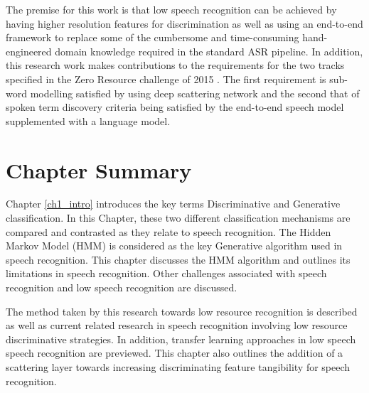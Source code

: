 The premise for this work is that low speech recognition can be achieved by having higher resolution features for discrimination as well as using an end-to-end framework to replace some of the cumbersome and time-consuming hand-engineered domain knowledge required in the standard ASR pipeline.  In addition, this research work makes contributions to the requirements for the two tracks specified in the Zero Resource challenge of 2015 \citep{versteegh2015zero}.  The first requirement is sub-word modelling satisfied by using deep scattering network and the second that of spoken term discovery criteria being satisfied by the end-to-end speech model supplemented with a language model.


\section{Chapter Summary}
Chapter \ref{ch1_intro} introduces the key terms Discriminative and Generative classification.  In this Chapter, these two different classification mechanisms are compared and contrasted as they relate to speech recognition.  The Hidden Markov Model (HMM) is considered as the key Generative algorithm used in speech recognition.  This chapter discusses the HMM algorithm and outlines its limitations in speech recognition.  Other challenges associated with speech recognition and low speech recognition are discussed.  

The method taken by this research towards low resource recognition is described as well as current related research in speech recognition involving low resource discriminative strategies.  In addition, transfer learning approaches in low speech speech recognition are previewed. This chapter also outlines the addition of a scattering layer towards increasing discriminating feature tangibility for speech recognition.
